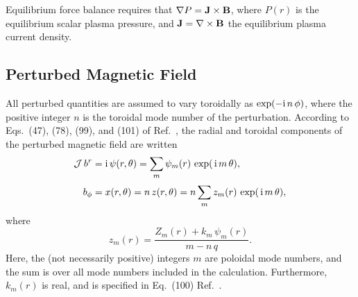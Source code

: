 \documentclass[12pt,prb,aps]{revtex4-1}
\begin{document}
Equilibrium force balance requires that
$ \nabla P={\bf J}\times {\bf B}$, 
where $P(r)$ is the equilibrium scalar plasma pressure, and ${\bf J}=\nabla\times {\bf B}$ the equilibrium plasma current density. 

\subsection{Perturbed Magnetic Field}\label{perturbed}
All perturbed quantities are assumed to vary toroidally as $\exp(-{\rm i}\,n\,\phi)$,
where the positive integer  $n$ is the toroidal mode number of the perturbation. 
According to Eqs.~(47), (78), (99), and (101) of Ref.~, the radial and toroidal components of the perturbed magnetic field are written 
\begin{align}\label{a3}
{\cal J}\,b^r &={\rm i}\,\psi(r,\theta)= \sum_m \psi_m(r)\,\exp(\,{\rm i}\,m\,\theta),\\[0.5ex]
b_\phi &= x(r,\theta)= n\,z(r,\theta) = n\sum_m z_m(r) \,\exp(\,{\rm i}\,m\,\theta),
\end{align}
where
\begin{equation}
z_m(r) = \frac{Z_m(r) + k_m\,\psi_m(r)}{m-n\,q}.
\end{equation}
Here, the (not necessarily positive) integers $m$ are poloidal mode numbers, and the sum is over all mode numbers included in the calculation. 
Furthermore, 
$k_m(r)$ is real, and is specified in Eq.~(100) Ref.~. 
\end{document}
